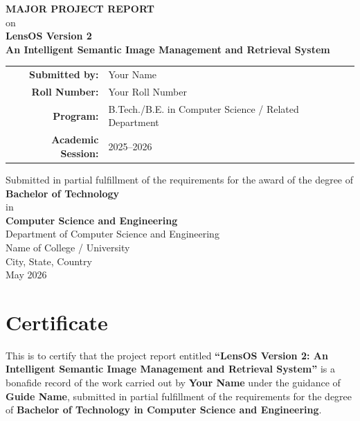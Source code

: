 \documentclass[12pt,a4paper]{report}
\begin{document}
\begin{titlepage}
    \centering
    {\Large \textbf{MAJOR PROJECT REPORT}}\\[1.2cm]
    {\large on}\\[0.4cm]
    {\Huge \textbf{LensOS Version 2}}\\[0.5cm]
    {\Large \textbf{An Intelligent Semantic Image Management and Retrieval System}}\\[1.2cm]

    \vfill

    \begin{tabular}{rl}
        \textbf{Submitted by:} & Your Name \\
        \textbf{Roll Number:} & Your Roll Number \\
        \textbf{Program:} & B.Tech./B.E. in Computer Science / Related Department \\
        \textbf{Academic Session:} & 2025--2026 \\
    \end{tabular}

    \vfill

    {\large Submitted in partial fulfillment of the requirements for the award of the degree of}\\[0.4cm]
    {\Large \textbf{Bachelor of Technology}}\\[0.4cm]
    {\large in}\\[0.2cm]
    {\Large \textbf{Computer Science and Engineering}}\\[1cm]

    {\large Department of Computer Science and Engineering}\\
    {\large Name of College / University}\\
    {\large City, State, Country}\\[1cm]

    {\large May 2026}
\end{titlepage}


\chapter*{Certificate}
This is to certify that the project report entitled \textbf{``LensOS Version 2: An Intelligent Semantic Image Management and Retrieval System''} is a bonafide record of the work carried out by \textbf{Your Name} under the guidance of \textbf{Guide Name}, submitted in partial fulfillment of the requirements for the degree of \textbf{Bachelor of Technology in Computer Science and Engineering}.
\end{document}
